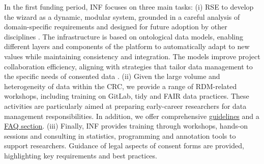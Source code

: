 \documentclass{eceasst}
\begin{document}
In the first funding period, INF focuses on three main tasks: 
(i) RSE to develop the wizard as a dynamic, modular system, grounded in a careful analysis of domain-specific requirements and designed for future adoption by other disciplines \cite{StrathmannJoppek2026}.
The infrastructure is based on ontological data models, enabling different layers and components of the platform to automatically adapt to new values while maintaining consistency and integration.
The models improve project collaboration efficiency, aligning with strategies that tailor data management to the specific needs of consented data \cite{Mohammadietal2026}. %
(ii) Given the large volume and heterogeneity of data within the CRC, we provide a range of RDM-related workshops, including training on GitLab, tidy and FAIR data practices. These activities are particularly aimed at preparing early-career researchers for data management responsibilities. In addition, we offer comprehensive \href{https://purl.org/crc1646/INF/guidelines}{guidelines} and a \href{https://purl.org/crc1646/INF/FAQ}{FAQ section}. 
(iii) Finally, INF provides training through workshops, hands-on sessions and consulting in statistics, programming and annotation tools to support researchers. Guidance of legal aspects of consent forms are provided, highlighting key requirements and best practices.
\end{document}
